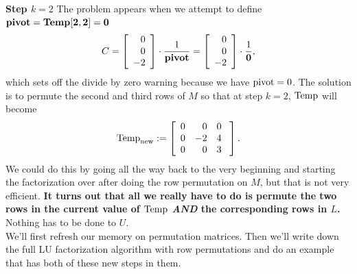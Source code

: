  \textbf{Step $k=2$} The problem appears when we attempt to define ${\rm \bf pivot=Temp[2,2]=0}$
$$C=   \left[\begin{array}{r} 0\\ 0 \\ -2 \end{array} \right] \cdot \frac{1}{{\rm \bf pivot}} = \left[\begin{array}{r} 0\\ 0 \\ -2 \end{array} \right] \cdot \frac{1}{\bf 0},$$
which sets off the divide by zero warning because we have ${\rm pivot}=0$. The solution is to permute the second and third rows of $M$ so that at step $k=2$, ${\rm Temp}$ will become
$${\rm Temp}_{\rm new}:=\left[ \begin{array}{rrr} 0 & 0 & 0\\
0 &-2 & 4 \\ 
 0 & 0& 3 \end{array}\ \right]. $$
 We could do this by going all the way back to the very beginning and starting the factorization over after doing the row permutation on $M$, but that is not very efficient. \textbf{It turns out that all we really have to do is permute the two rows in the current value of ${\rm Temp}$ \textit{AND} the corresponding rows in $L$.} Nothing has to be done to $U$. \\
 
 We'll first refresh our memory on permutation matrices. Then we'll write down the full LU factorization algorithm with row permutations and do an example that has both of these new steps in them. \\
 
